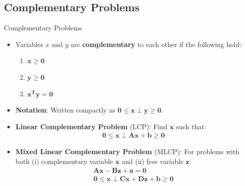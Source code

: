 \documentclass[10pt]{beamer}
\begin{document}
\subsection{Complementary Problems}
\begin{frame}{Complementary Problems}
	\begin{itemize}
		\item Variables $x$ and $y$ are \textbf{complementary} to each other if the following hold:
		\begin{enumerate}
			\item $\mathbf{x \geq 0}$		\vspace{2mm}
			\item $\mathbf{y \geq 0}$		\vspace{2mm}
			\item $\mathbf{x^T y = 0}$	\vspace{0.5mm}
		\end{enumerate}
		\item \textbf{Notation}: Written compactly as $\mathbf{0 \leq x \perp y \geq 0}$. 
		\vspace{2mm}
		\item \textbf{Linear Complementary Problem} (LCP): Find $\mathbf{x}$ such that:
			\begin{align*}
				\mathbf{0 \leq x \perp Ax + b \geq 0}
			\end{align*}
		\item \textbf{Mixed Linear Complementary Problem} (MLCP): For problems with both (i) complementary variable $\mathbf{x}$ and (ii) free variable $\mathbf{z}$:
			\begin{align*}
				\mathbf{Ax - Bz + a = 0} \\ 
				\mathbf{0 \leq x \perp Cx + Dz + b\geq 0}
			\end{align*}
	\end{itemize}
\end{frame}
\end{document}
